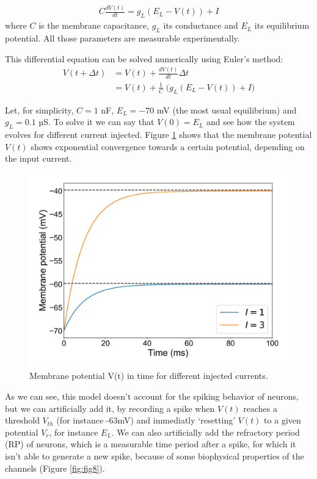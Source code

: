 \documentclass{article}
\begin{document}
\begin{align*}
  C\frac{dV(t)}{dt} = g_L(E_L - V(t)) + I
\end{align*}
\noindent where $C$ is the membrane capacitance, $g_L$ its conductance and $E_L$ its equilibrium potential. All those parameters are measurable experimentally.

\indent This differential equation can be solved numerically using Euler's method:
\begin{align*}
  V(t+\Delta t) &= V(t) + \frac{dV(t)}{dt} \Delta t\\
                &= V(t) + \frac{1}{C} \; \big( g_L(E_L - V(t)) + I \big)
\end{align*}


Let, for simplicity, $C= 1$ nF, $E_L=-70$ mV (the most usual equilibrium) and $g_L=0.1$ µS. To solve it we can say that $V(0)=E_L$ and see how the system evolves for different current injected. Figure \ref{fig:fig7} shows that the membrane potential $V(t)$ shows exponential convergence towards a certain potential, depending on the input current.
\begin{figure}[H]
\centering
\includegraphics[width=.8\linewidth]{report3_fig9.png}
\caption[growing population]{Membrane potential V(t) in time for different injected currents.}\label{fig:fig7}
\end{figure}

As we can see, this model doesn't account for the spiking behavior of neurons, but we can artificially add it, by recording a spike when $V(t)$ reaches a threshold $V_{th}$ (for instance -63mV) and immediatly `resetting' $V(t)$ to a given potential $V_r$, for instance $E_L$. We can also artificially add the refractory period (RP) of neurons, which is a measurable time period after a spike, for which it isn't able to generate a new spike, because of some biophysical properties of the channels (Figure \ref{fig:fig8}).
\end{document}
